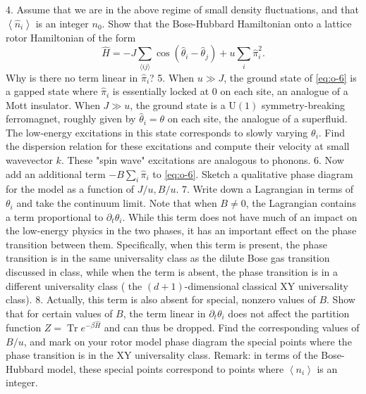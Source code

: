 \documentclass[hyperref, a4paper]{article}
\begin{document}
4. Assume that we are in the above regime of small density fluctuations, and that $\left\langle\hat{n}_i\right\rangle$ is an integer $n_0$. Show that the Bose-Hubbard Hamiltonian onto a lattice rotor Hamiltonian of the form
\begin{equation}
    \hat{H}=-J \sum_{\langle i j\rangle} \cos \left(\hat{\theta}_i-\hat{\theta}_j\right)+u \sum_i \hat{\pi}_i^2 .
    \label{eq:o-6}
\end{equation}
Why is there no term linear in $\hat{\pi}_i$?
5. When $u \gg J$, the ground state of \eqref{eq:o-6} is a gapped state where $\hat{\pi}_i$ is essentially locked at 0 on each site, an analogue of a Mott insulator. When $J \gg u$, the ground state is a $\mathrm{U}(1)$ symmetry-breaking ferromagnet, roughly given by $\hat{\theta}_i=\theta$ on each site, the analogue of a superfluid. The low-energy excitations in this state corresponds to slowly varying $\theta_i$. Find the dispersion relation for these excitations and compute their velocity at small wavevector $k$. These "spin wave" excitations are analogous to phonons.
6. Now add an additional term $-B \sum_i \hat{\pi}_i$ to \eqref{eq:o-6}. Sketch a qualitative phase diagram for the model as a function of $J / u, B / u$.
7. Write down a Lagrangian in terms of $\theta_i$ and take the continuum limit. Note that when $B \neq 0$, the Lagrangian contains a term proportional to $\partial_t \theta_i$. While this term does not have much of an impact on the low-energy physics in the two phases, it has an important effect on the phase transition between them. Specifically, when this term is present, the phase transition is in the same universality class as the dilute Bose gas transition discussed in class, while when the term is absent, the phase transition is in a different universality class ( the $(d+1)$-dimensional classical XY universality class).
8. Actually, this term is also absent for special, nonzero values of $B$. Show that for certain values of $B$, the term linear in $\partial_t \theta_i$ does not affect the partition function $Z=\operatorname{Tr} e^{-\beta \hat{H}}$ and can thus be dropped. Find the corresponding values of $B / u$, and mark on your rotor model phase diagram the special points where the phase transition is in the XY universality class. Remark: in terms of the Bose-Hubbard model, these special points correspond to points where $\left\langle n_i\right\rangle$ is an integer.
\end{document}
